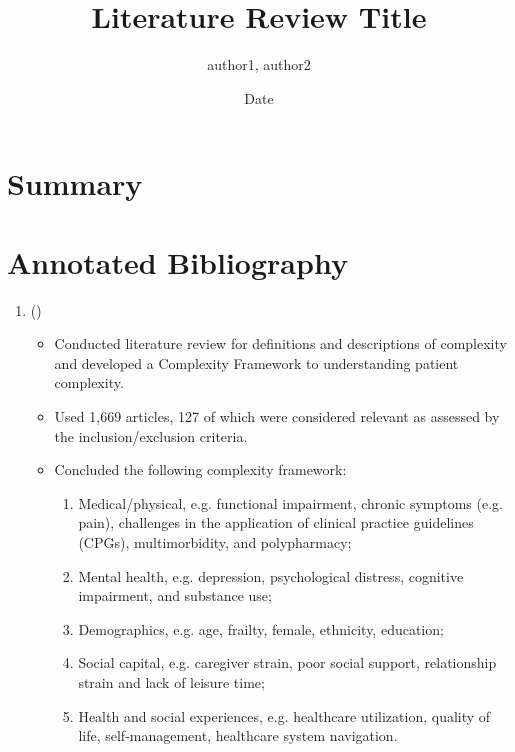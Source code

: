 \documentclass{article}
\title{Literature Review Title}
\date{Date}
\author{author1, author2}
\begin{document}
	\maketitle
	
\section*{Summary}

\lipsum[2]



\section*{Annotated Bibliography}

\begin{enumerate}

	\item (\citeyear{schaink2012scoping}) \cite{schaink2012scoping} 
	\begin{itemize}
		\item Conducted literature review for definitions and descriptions of complexity and developed a Complexity Framework to understanding patient complexity.
		\item Used 1,669 articles, 127 of which were considered relevant as assessed by the inclusion/exclusion criteria. 
		\item Concluded the following complexity framework:
		\begin{enumerate}
			\item Medical/physical, e.g. functional impairment, chronic symptoms (e.g. pain), challenges in the application of clinical practice guidelines (CPGs), multimorbidity, and polypharmacy;
			\item Mental health, e.g. depression, psychological distress, cognitive impairment, and substance use;		
			\item Demographics, e.g. age, frailty, female, ethnicity, education;
			\item Social capital, e.g. caregiver strain, poor social support, relationship strain and lack of leisure time;		
			\item Health and social experiences, e.g. healthcare utilization, quality of life, self-management, healthcare system navigation.
		\end{enumerate}
	\end{itemize}


\end{enumerate}
\end{document}
